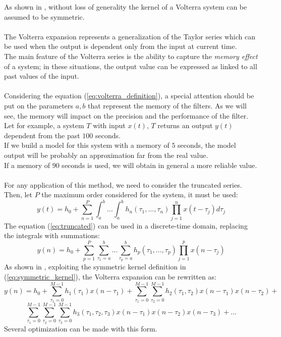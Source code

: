 As shown in \cite{volterra}, without loss of generality the kernel of a Volterra system can be assumed to be symmetric.\\\\ 
The Volterra expansion represents a generalization of the Taylor series which can be used when the output is dependent only from the input at current time.\\
The main feature of the Volterra series is the ability to capture the \textit{memory effect} of a system; in these situations, the output value can be expressed as linked to all past values of the input.\\\\
Considering the equation (\ref{eq:volterra_definition}), a special attention should be put on the parameters $a, b$ that represent the memory of the filters. As we will see, the memory will impact on the precision and the performance of the filter.\\
Let for example, a system $T$ with input $x(t)$, $T$ returns an output $y(t)$ dependent from the past $100$ seconds.\\ 
If we build a model for this system with a memory of $5$ seconds, the model output will be probably an approximation far from the real value.\\
If a memory of $90$ seconds is used, we will obtain in general a more reliable value. \\\\
For any application of this method, we need to consider the truncated series. Then, let $P$ the maximum order considered for the system, it must be used:
\begin{equation}
y(t) = h_0 + \sum_{n=1}^{P} \int_a^b ... \int_a^b \! h_n(\tau_1, ..., \tau_n) \prod_{j=1}^n x(t-\tau_j) d\tau_j
\label{eq:truncated}
\end{equation}
The equation (\ref{eq:truncated}) can be used in a discrete-time domain, replacing the integrals with summations:
\begin{equation}
y(n) = h_0 + \sum_{p=1}^P \sum_{\tau_1=a}^b ... \sum_{\tau_p=a}^b \! h_p(\tau_1, ..., \tau_p) \prod_{j=1}^p x(n-\tau_j)
\end{equation}
As shown in \cite{loudspeakerchar}, exploiting the symmetric kernel definition in (\ref{eq:symmetric_kernel}), the Volterra expansion can be rewritten as:
\[
y(n) = h_0 + \sum_{\tau_1=0}^{M-1} h_1(\tau_1)x(n-\tau_1) + \sum_{\tau_1=0}^{M-1}\sum_{\tau_2=0}^{M-1} h_2(\tau_1, \tau_2)x(n-\tau_1)x(n-\tau_2) + \]
\[ \sum_{\tau_1=0}^{M-1} \sum_{\tau_2=0}^{M-1} \sum_{\tau_3=0}^{M-1} h_3(\tau_1, \tau_2, \tau_3) x(n-\tau_1)x(n-\tau_2) x(n-\tau_3) + ...\]
Several optimization can be made with this form.
